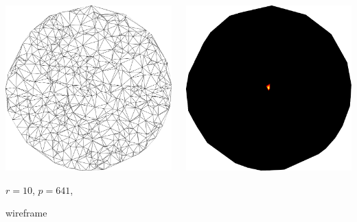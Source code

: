 \documentclass[aspectratio=169,t]{beamer}
\begin{document}
{\begin{columns}
\begin{column}{0.22\textwidth}
			\includegraphics[width=.85\textwidth]{data/synthetic_meshes/random_circle_tessellation_Dirac_delta_10_v641_f1252_wireframe.png}
			{\footnotesize 
				\par \vspace{-1mm} $r=10$, $p=641$,
				\par \vspace{-1mm} wireframe
			}
		\end{column}
		\begin{column}{0.22\textwidth}
			\centering
			\includegraphics[width=.85\textwidth]{data/synthetic_meshes/random_circle_tessellation_Dirac_delta_10_v641_f1252_funcvals_0iter.png}

\end{column}
\end{columns}}
\end{document}
